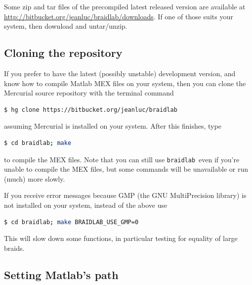 \documentclass[12pt]{article}
\newcommand{\braidlab}{\texttt{braidlab}}%
\begin{document}
Some zip and tar files of the precompiled latest released version are
available at \url{http://bitbucket.org/jeanluc/braidlab/downloads}.  If one of
those suits your system, then download and untar/unzip.


\subsection{Cloning the repository}
\label{sec:cloning}

 If you prefer to have the latest (possibly unstable)
development version, and know how to compile Matlab MEX %
 files on your system, then you can clone the
Mercurial source repository with the terminal command
\begin{lstlisting}[frame=single,framerule=0pt,escapechar=*,%
  language=bash,backgroundcolor=\color{white}]
$ hg clone https://bitbucket.org/jeanluc/braidlab
\end{lstlisting}
assuming Mercurial is installed on your system.  After this finishes, type
\begin{lstlisting}[frame=single,framerule=0pt,escapechar=*,%
  language=bash,backgroundcolor=\color{white}]
$ cd braidlab; make
\end{lstlisting}
to compile the MEX files.  Note that you can still use \braidlab\ even if
you're unable to compile the MEX files, but some commands will be unavailable
or run (much) more slowly.

 If you receive error messages because GMP (the GNU MultiPrecision
library) is not installed on your system, instead of the above use
\begin{lstlisting}[frame=single,framerule=0pt,escapechar=*,%
  language=bash,backgroundcolor=\color{white}]
$ cd braidlab; make BRAIDLAB_USE_GMP=0
\end{lstlisting}
This will slow down some functions, in particular testing for equality of
large braids.


\subsection{Setting Matlab's path}
\label{sec:path}

\lstset{language=Matlab}
\lstset{breaklines=true}
\end{document}
